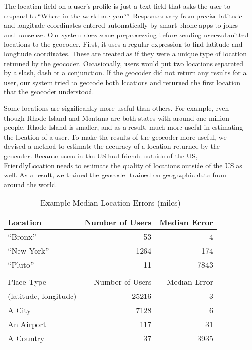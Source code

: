 The location field on a user's profile is just a text field that asks the user
to respond to ``Where in the world are you?''.
Responses vary from precise latitude and longitude coordinates entered
automatically by smart phone apps to jokes and nonsense.
Our system does some preprocessing before sending user-submitted locations to
the geocoder.
First, it uses a regular expression to find latitude and longitude coordinates.
These are treated as if they were a unique type of location returned by the
geocoder.
Occasionally, users would put two locations separated by a slash, dash or a
conjunction. If the geocoder did not return any results for a user, our system tried to
geocode both locations and returned the first location that the geocoder
understood.

Some locations are significantly more useful than others.
For example, even though Rhode Island and Montana are both states with around
one million people, Rhode Island is smaller, and as a result, much more useful
in estimating the location of a user.
To make the results of the geocoder more useful, we devised a method to
estimate the accuracy of a location returned by the geocoder.
Because users in the US had friends outside of the US, FriendlyLocation needs
to estimate the quality of
locations outside of the US as well.
As a result, we trained the geocoder trained on geographic data from around the world.

\begin{table}[t]
\centering
\caption{Example Median Location Errors (miles)}
\begin{tabular}{l r r} 
Location&Number of Users&Median Error\\ \hline
``Bronx''&53&4\\
``New York''&1264&174\\
``Pluto''&11&7843\\ \hline
\\
Place Type&Number of Users&Median Error\\ \hline
(latitude, longitude)&25216&3\\
A City&7128&6\\
An Airport&117&31\\
A Country&37&3935\\
\hline\end{tabular}
\label{tab:MedianLocErr}
\end{table}


